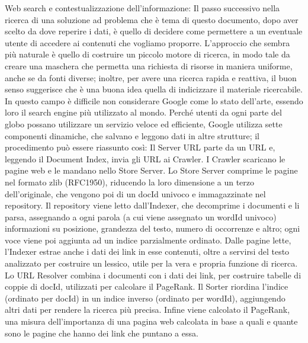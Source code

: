 \documentclass[sigproc-sp.tex]{subfiles}
\begin{document}
Web search e contestualizzazione dell’informazione: 
Il passo successivo nella ricerca di una soluzione ad problema che è tema di questo documento, dopo aver scelto da dove reperire i dati, è quello di decidere come permettere a un eventuale utente di accedere ai contenuti che vogliamo proporre. L’approccio che sembra più naturale è quello di costruire un piccolo motore di ricerca, in modo tale da creare una maschera che permetta una richiesta di risorse in maniera uniforme, anche se da fonti diverse; inoltre, per avere una ricerca rapida e reattiva, il buon senso suggerisce che è una buona idea quella di indicizzare il materiale ricercabile.
In questo campo è difficile non considerare Google come lo stato dell’arte, essendo loro il search engine più utilizzato al mondo. Perché utenti da ogni parte del globo possano utilizzare un servizio veloce ed efficiente, Google utilizza sette componenti dinamiche, che salvano e leggono dati in altre strutture; il procedimento può essere riassunto così: 
Il Server URL parte da un URL e, leggendo il Document Index, invia gli URL ai Crawler.
I Crawler scaricano le pagine web e le mandano nello Store Server.
Lo Store Server comprime le pagine nel formato zlib (RFC1950), riducendo la loro dimensione a un terzo dell’originale, che vengono poi di un docId univoco e immagazzinate nel repository.
Il repository viene letto dall’Indexer, che decomprime i documenti e li parsa, assegnando a ogni parola (a cui viene assegnato un wordId univoco) informazioni su posizione, grandezza del testo, numero di occorrenze e altro; ogni voce viene poi aggiunta ad un indice parzialmente ordinato. Dalle pagine lette, l’Indexer estrae anche i dati dei link in esse contenuti, oltre a servirsi del testo analizzato per costruire un lessico, utile per la vera e propria funzione di ricerca.
Lo URL Resolver combina i documenti con i dati dei link, per costruire tabelle di coppie di docId, utilizzati per calcolare il PageRank.
Il Sorter riordina l’indice (ordinato per docId) in un indice inverso (ordinato per wordId), aggiungendo altri dati per rendere la ricerca più precisa.
Infine viene calcolato il PageRank, una misura dell’importanza di una pagina web calcolata in base a quali e quante sono le pagine che hanno dei link che puntano a essa.
\end{document}
